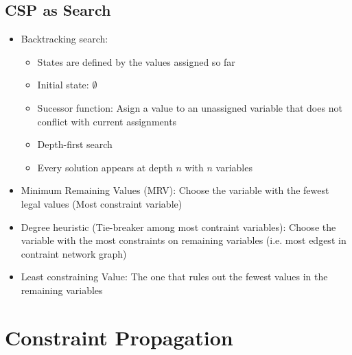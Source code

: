 \documentclass{scrartcl}
\begin{document}
\subsection{CSP as Search}
\begin{itemize}
    \item
        Backtracking search:
        \begin{itemize}
            \item
                States are defined by the values assigned so far
            \item
                Initial state: $\emptyset$
            \item
                Sucessor function: Asign a value to an unassigned variable that does not conflict with current assignments
            \item
                Depth-first search
            \item
                Every solution appears at depth $n$ with $n$ variables
        \end{itemize}
    \item
        Minimum Remaining Values (MRV): Choose the variable with the fewest legal values (Most constraint variable)
    \item
        Degree heuristic (Tie-breaker among most contraint variables): Choose the variable with the most constraints on remaining variables (i.e. most edgest in contraint network graph)
    \item
        Least constraining Value: The one that rules out the fewest values in the remaining variables
\end{itemize}

\section{Constraint Propagation}
\end{document}
